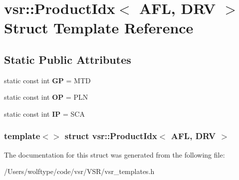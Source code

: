 \hypertarget{structvsr_1_1_product_idx_3_01_a_f_l_00_01_d_r_v_01_4}{\section{vsr\-:\-:Product\-Idx$<$ A\-F\-L, D\-R\-V $>$ Struct Template Reference}
\label{structvsr_1_1_product_idx_3_01_a_f_l_00_01_d_r_v_01_4}
}
\subsection*{Static Public Attributes}
\begin{DoxyCompactItemize}
\item 
\hypertarget{structvsr_1_1_product_idx_3_01_a_f_l_00_01_d_r_v_01_4_a212f19232080131602dd0ef2fc210bc4}{static const int {\bfseries G\-P} = M\-T\-D}\label{structvsr_1_1_product_idx_3_01_a_f_l_00_01_d_r_v_01_4_a212f19232080131602dd0ef2fc210bc4}

\item 
\hypertarget{structvsr_1_1_product_idx_3_01_a_f_l_00_01_d_r_v_01_4_a73f611b0fc12049781240308528fe3ba}{static const int {\bfseries O\-P} = P\-L\-N}\label{structvsr_1_1_product_idx_3_01_a_f_l_00_01_d_r_v_01_4_a73f611b0fc12049781240308528fe3ba}

\item 
\hypertarget{structvsr_1_1_product_idx_3_01_a_f_l_00_01_d_r_v_01_4_a71bf6fe8df0c323bfa0ec0c6ca96ccb9}{static const int {\bfseries I\-P} = S\-C\-A}\label{structvsr_1_1_product_idx_3_01_a_f_l_00_01_d_r_v_01_4_a71bf6fe8df0c323bfa0ec0c6ca96ccb9}

\end{DoxyCompactItemize}
\subsubsection*{template$<$$>$ struct vsr\-::\-Product\-Idx$<$ A\-F\-L, D\-R\-V $>$}



The documentation for this struct was generated from the following file\-:\begin{DoxyCompactItemize}
\item 
/\-Users/wolftype/code/vsr/\-V\-S\-R/vsr\-\_\-templates.\-h\end{DoxyCompactItemize}
